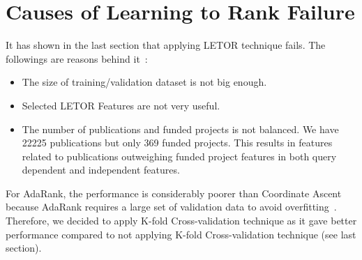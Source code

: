 \section{Causes of Learning to Rank Failure}
It has shown in the last section that applying LETOR technique fails. The followings are reasons behind it~\cite{craig}:
\begin{itemize}
 \item The size of training/validation dataset is not big enough.
 \item Selected LETOR Features are not very useful.
 \item The number of publications and funded projects is not balanced. We have 22225 publications but only 369 funded projects. This results in 
 features related to publications outweighing funded project features in both query dependent and independent features.
\end{itemize}
For AdaRank, the performance is considerably poorer than Coordinate Ascent because AdaRank requires a large set of validation data to avoid overfitting~\cite{craig}.
Therefore, we decided to apply K-fold Cross-validation technique as it gave better performance compared to not applying K-fold Cross-validation technique
(see last section).

